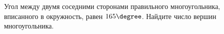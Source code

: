 \begin{ex}
	\begin{condition}
		Угол между двумя соседними сторонами правильного многоугольника, вписанного в окружность, равен \( 165\degree \). Найдите число вершин многоугольника.
	\end{condition}
\end{ex}